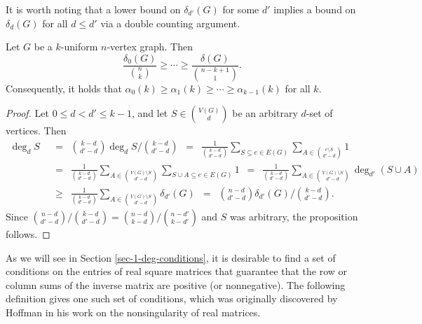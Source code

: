 \documentclass[11pt]{article}
\begin{document}

It is worth noting that a lower bound on $\delta_{d'}(G)$ for some $d'$ implies a bound on $\delta_d(G)$ for all $d\le d'$ via a double counting argument.

\begin{proposition}\label{prop-mono-delta}
    Let $G$ be a $k$-uniform $n$-vertex graph. Then
    $$\frac{\delta_0(G)}{\binom{n}{k}}\ge\cdots\ge\frac{\delta(G)}{\binom{n-k+1}{1}}.$$
    Consequently, it holds that $\alpha_0(k)\ge\alpha_1(k)\ge\cdots\ge\alpha_{k-1}(k)$ for all $k$.
\end{proposition}

\begin{proof}
    Let $0\le d< d'\le k-1$, and let $S\in \binom{V(G)}{d}$ be an arbitrary $d$-set of vertices. Then
    \begin{align*}
        \deg_dS &\,\,\,=\,\,\, \binom{k-d}{d'-d}\deg_dS\Big/\binom{k-d}{d'-d} \,\,\,=\,\,\, \frac{1}{\binom{k-d}{d'-d}}\sum_{S\subseteq e\in E(G)} \sum_{A\in\binom{e\setminus S}{d'-d}}1 \\
        &\,\,\,=\,\,\, \frac{1}{\binom{k-d}{d'-d}}\sum_{A\in\binom{V(G)\setminus S}{d'-d}}\sum_{S\cup A\subseteq e\in E(G)}1 \,\,\,=\,\,\, \frac{1}{\binom{k-d}{d'-d}}\sum_{A\in\binom{V(G)\setminus S}{d'-d}}\deg_{d'}(S\cup A) \\
        &\,\,\,\ge\,\,\, \frac{1}{\binom{k-d}{d'-d}}\sum_{A\in\binom{V(G)\setminus S}{d'-d}}\delta_{d'}(G) \,\,\,=\,\,\, \binom{n-d}{d'-d}\delta_{d'}(G)\Big/\binom{k-d}{d'-d}.
    \end{align*}
    Since $\binom{n-d}{d'-d}/\binom{k-d}{d'-d}=\binom{n-d}{k-d}/\binom{n-d'}{k-d'}$ and $S$ was arbitrary, the proposition follows.
\end{proof}

As we will see in Section \ref{sec-1-deg-conditions}, it is desirable to find a set of conditions on the entries of real square matrices that guarantee that the row or column sums of the inverse matrix are positive (or nonnegative). The following definition gives one such set of conditions, which was originally discovered by Hoffman \cite{hoffman1965nonsingularity} in his work on the nonsingularity of real matrices.
\end{document}
